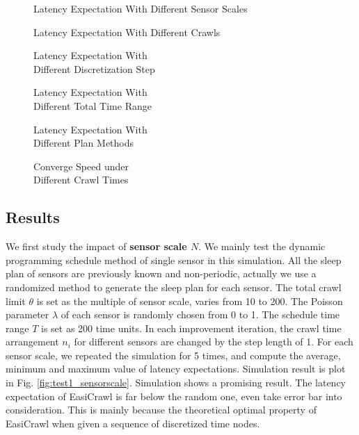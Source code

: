 \documentclass[conference]{IEEEtran}
\begin{document}
\begin{figure*}
		
		\captionsetup{justification=centering}
		\caption{Latency Expectation With Different Sensor Scales}
		\label{fig:test1_sensorscale}
	\endminipage\hfill
		
		\captionsetup{justification=centering}
		\caption{Latency Expectation With Different Crawls}
		\label{fig:test2_totalcrawl}
	\endminipage\hfill
		
		\captionsetup{justification=centering}
		\caption{Latency Expectation With \\Different Discretization Step}
		\label{fig:test3_discretestep}
	\endminipage
	
		
		\captionsetup{justification=centering}
		\caption{Latency Expectation With \\Different Total Time Range}
		\label{fig:test4_timerange}
	\endminipage\hfill
		
		\captionsetup{justification=centering}
		\caption{Latency Expectation With \\Different Plan Methods}
		\label{fig:test5_sensortype}
	\endminipage\hfill
		
		\captionsetup{justification=centering}
		\caption{Converge Speed under \\Different Crawl Times}
		\label{fig:test6_convergespeed}
	\endminipage	
\end{figure*}

\subsection{Results}

We first study the impact of \textbf{sensor scale $N$}. We mainly test the dynamic programming schedule method of single sensor in this simulation. All the sleep plan of sensors are previously known and non-periodic, actually we use a randomized method to generate the sleep plan for each sensor. The total crawl limit $\theta$ is set as the multiple of sensor scale, varies from 10 to 200. The Poisson parameter $\lambda$ of each sensor is randomly chosen from 0 to 1. The schedule time range $T$ is set as 200 time units. In each improvement iteration, the crawl time arrangement $n_i$ for different sensors are changed by the step length of 1. For each sensor scale, we repeated the simulation for 5 times, and compute the average, minimum and maximum value of latency expectations. Simulation result is plot in Fig. \ref{fig:test1_sensorscale}.
Simulation shows a promising result. The latency expectation of EasiCrawl is far below the random one, even take error bar into consideration. This is mainly because the theoretical optimal property of EasiCrawl when given a sequence of discretized time nodes. 
\end{document}
